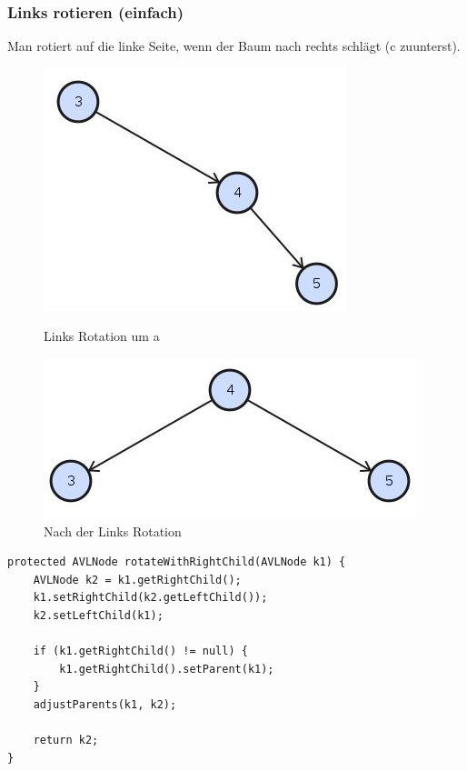 \subsubsection{Links rotieren (einfach)}
Man rotiert auf die linke Seite, wenn der Baum nach rechts schlägt (c zuunterst).
\begin{figure}[h!]
	\centering
	\begin{minipage}[t]{0.4\textwidth}
		\centering
		\includegraphics[width=0.7\linewidth]{images/avl_left_rotation_1}
		\caption{Links Rotation um a}
		\label{fig:trieexample}
	\end{minipage}
	\begin{minipage}[t]{0.4\textwidth}
		\centering
		\includegraphics[width=0.9\linewidth]{images/avl_rotation_final}
		\caption{Nach der Links Rotation}
		\label{fig:searchtreeinsert2}
	\end{minipage}
\end{figure}

\begin{lstlisting}[caption=AVL Tree: Single left rotation]
protected AVLNode rotateWithRightChild(AVLNode k1) {
	AVLNode k2 = k1.getRightChild();
	k1.setRightChild(k2.getLeftChild());
	k2.setLeftChild(k1);

	if (k1.getRightChild() != null) {
		k1.getRightChild().setParent(k1);
	}
	adjustParents(k1, k2);
	
	return k2;
}
\end{lstlisting}

